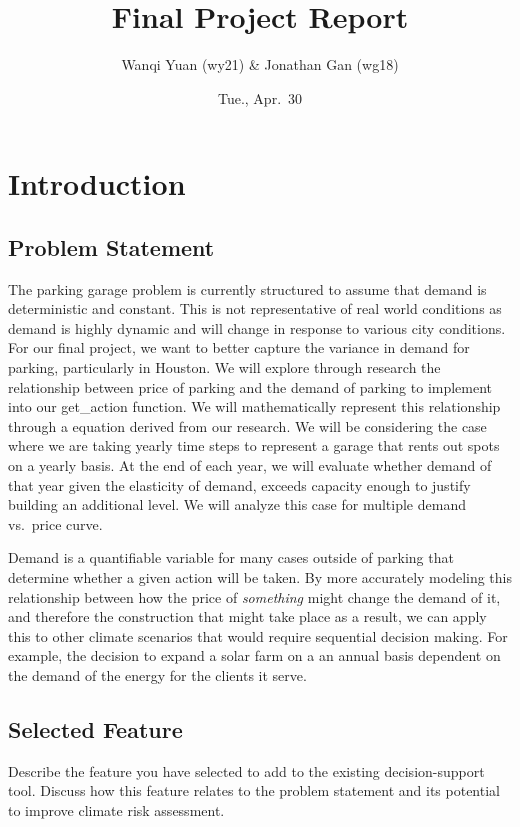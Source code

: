 \documentclass[
  11pt,
]{article}
\title{Final Project Report}
\author{Wanqi Yuan (wy21) \& Jonathan Gan (wg18)}
\date{Tue., Apr.~30}
\begin{document}
\maketitle

\section{Introduction}\label{introduction}

\subsection{Problem Statement}\label{problem-statement}

The parking garage problem is currently structured to assume that demand
is deterministic and constant. This is not representative of real world
conditions as demand is highly dynamic and will change in response to
various city conditions. For our final project, we want to better
capture the variance in demand for parking, particularly in Houston. We
will explore through research the relationship between price of parking
and the demand of parking to implement into our get\_action function. We
will mathematically represent this relationship through a equation
derived from our research. We will be considering the case where we are
taking yearly time steps to represent a garage that rents out spots on a
yearly basis. At the end of each year, we will evaluate whether demand
of that year given the elasticity of demand, exceeds capacity enough to
justify building an additional level. We will analyze this case for
multiple demand vs.~price curve.

Demand is a quantifiable variable for many cases outside of parking that
determine whether a given action will be taken. By more accurately
modeling this relationship between how the price of \emph{something}
might change the demand of it, and therefore the construction that might
take place as a result, we can apply this to other climate scenarios
that would require sequential decision making. For example, the decision
to expand a solar farm on a an annual basis dependent on the demand of
the energy for the clients it serve.

\subsection{Selected Feature}\label{selected-feature}

Describe the feature you have selected to add to the existing
decision-support tool. Discuss how this feature relates to the problem
statement and its potential to improve climate risk assessment.
\end{document}
